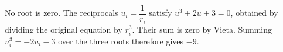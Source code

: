 No root is zero. The reciprocals $u_i=\dfrac{1}{r_i}$ satisfy $u^3+2u+3=0$, obtained by dividing the original equation by $r_i^3$. Their sum is zero by Vieta. Summing $u_i^3=-2u_i-3$ over the three roots therefore gives $\boxed{-9}$.
